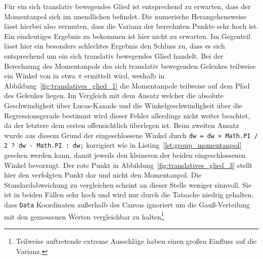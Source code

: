 Für ein sich translativ bewegendes Glied ist entsprechend zu erwarten, dass der Momentanpol sich im unendlichen befindet.
Die numerische Herangehensweise lässt hierbei also vermuten, dass die Varianz der berechnten Punkte sehr hoch ist.
Ein eindeutiges Ergebnis zu bekommen ist hier nicht zu erwarten.
Im Gegenteil lässt hier ein besonders schlechtes Ergebnis den Schluss zu, dass es sich entsprechend um ein sich translativ bewegendes Glied handelt.
Bei der Berechnung des Momentanpols des sich translativ bewegenden Gelenkes teilweise ein Winkel von in etwa $\pi$ ermittelt wird, weshalb in Abbildung~\ref{fig:translatives_glied_1} die Momentanpole teilweise auf dem Pfad des Gelenkes liegen.
Im Vergleich mit dem Ansatz welcher die absolute Geschwindigkeit über Lucas-Kanade und die Winkelgeschwindigkeit über die Regressionsgerade bestimmt wird dieser Fehler allerdings nicht weiter beachtet, da der letztere dem ersten offensichtlich überlegen ist.
Beim zweiten Ansatz wurde aus diesem Grund der eingeschlossene Winkel durch \lstinline{dw = dw > Math.PI / 2 ? dw - Math.PI : dw;} korrigiert wie in Listing~\ref{lst:group_momentanpol} gesehen werden kann, damit jeweils den kleineren der beiden eingeschlossenen Winkel bevorzugt.
Der rote Punkt in Abbildung~\ref{fig:translatives_glied_3} stellt hier den verfolgten Punkt dar und nicht den Momentanpol.
Die Standardabweichung zu vergleichen scheint an dieser Stelle weniger sinnvoll.
Sie ist in beiden Fällen sehr hoch und wird nur durch die Tatsache niedrig gehalten, dass \lstinline{Data} Koordinaten au{\ss}erhalb des Canvas ignoriert um die Gau{\ss}-Verteilung mit den gemessenen Werten vergleichbar zu halten\footnote{Teilweise auftretende extreme Ausschläge haben einen gro{\ss}en Einfluss auf die Varianz.}


